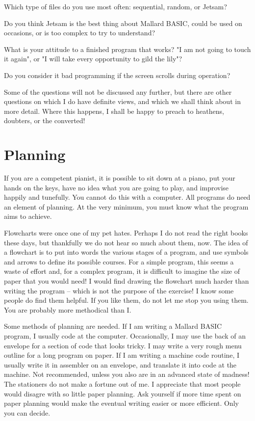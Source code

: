 \documentclass[]{report} %
\begin{document}
Which type of files do you use most often: sequential, random, or Jetsam?

Do  you think Jetsam is the best thing about Mallard BASIC, could be  used  on 
occasions, or is too complex to try to understand?

What  is  your attitude to a finished program that works? "I am not  going  to 
touch it again", or "I will take every opportunity to gild the lily"?

Do you consider it bad programming if the screen scrolls during operation?

Some  of the questions will not be discussed any further, but there are  other 
questions on which I do have definite views, and which we shall think about in 
more  detail.  Where  this happens, I shall be happy to  preach  to  heathens, 
doubters, or the converted!

\section{Planning}
If  you  are a competent pianist, it is possible to sit down at a  piano,  put 
your hands on the keys, have no idea what you are going to play, and improvise 
happily  and  tunefully. You cannot do this with a computer. All  programs  do 
need  an  element  of planning. At the very minimum, you must  know  what  the 
program aims to achieve.

Flowcharts  were  once one of my pet hates. Perhaps I do not  read  the  right 
books  these days, but thankfully we do not hear so much about them, now.  The 
idea of a flowchart is to put into words the various stages of a program,  and 
use  symbols and arrows to define its possible courses. For a simple  program, 
this  seems a waste of effort and, for a complex program, it is  difficult  to 
imagine  the  size  of paper that you would need! I  would  find  drawing  the 
flowchart much harder than writing the program -- which is not the purpose  of 
the  exercise! I know some people do find them helpful. If you like  them,  do 
not let me stop you using them. You are probably more methodical than I.

Some methods of planning are needed. If I am writing a Mallard BASIC  program, 
I  usually  code  at  the computer. Occasionally, I may use  the  back  of  an 
envelope  for  a section of code that looks tricky. I may write a  very  rough 
menu  outline  for  a long program on paper. If I am writing  a  machine  code 
routine, I usually write it in assembler on an envelope, and translate it into 
code at the machine. Not recommended, unless you also are in an advanced state 
of madness! The stationers do not make a fortune out of me. I appreciate  that 
most people would disagre with so little paper planning. Ask yourself if  more 
time  spent on paper planning would make the eventual writing easier  or  more 
efficient. Only you can decide.
\end{document}
